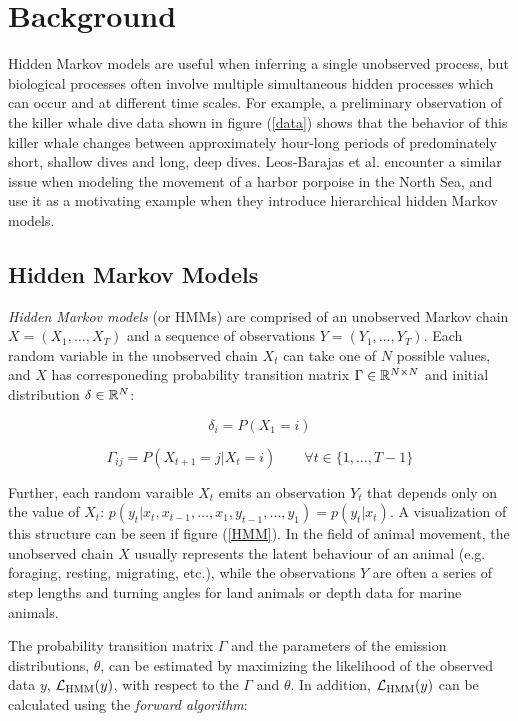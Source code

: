 
\section{Background}

Hidden Markov models are useful when inferring a single unobserved process, but biological processes often involve multiple simultaneous hidden processes which can occur and at different time scales. For example, a preliminary observation of the killer whale dive data shown in figure (\ref{data}) shows that the behavior of this killer whale changes between approximately hour-long periods of predominately short, shallow dives and long, deep dives. Leos-Barajas et al. encounter a similar issue when modeling the movement of a harbor porpoise in the North Sea, and use it as a motivating example when they introduce hierarchical hidden Markov models.

\subsection{Hidden Markov Models}

\textit{Hidden Markov models} (or HMMs) are comprised of an unobserved Markov chain $X = (X_1, \ldots, X_T)$ and a sequence of observations $Y = (Y_1, \ldots, Y_T)$. Each random variable in the unobserved chain $X_t$ can take one of $N$ possible values, and $X$ has corresponeding probability transition matrix $\Gamma \in \mathbb{R}^{N \times N}$ and initial distribution $\delta \in \mathbb{R}^N$:

$$\delta_i = P(X_1 = i)$$

$$ \Gamma_{ij} = P(X_{t+1} = j | X_t = i) \qquad \forall t \in \{ 1, \ldots, T-1\} $$

Further, each random varaible $X_t$ emits an observation $Y_t$ that depends only on the value of $X_t$: $p(y_t|x_t, x_{t-1}, \ldots , x_1, y_{t-1}, \ldots , y_1) = p(y_t|x_t)$. A visualization of this structure can be seen if figure (\ref{HMM}). In the field of animal movement, the unobserved chain $X$ usually represents the latent behaviour of an animal (e.g. foraging, resting, migrating, etc.), while the observations $Y$ are often a series of step lengths and turning angles for land animals or depth data for marine animals.

The probability transition matrix $\Gamma$ and the parameters of the emission distributions, $\theta$, can be estimated by maximizing the likelihood of the observed data $y$, $\mathcal{L}_{\text{HMM}}(y)$, with respect to the $\Gamma$ and $\theta$. In addition, $\mathcal{L}_{\text{HMM}}(y)$ can be calculated using the \textit{forward algorithm}:

